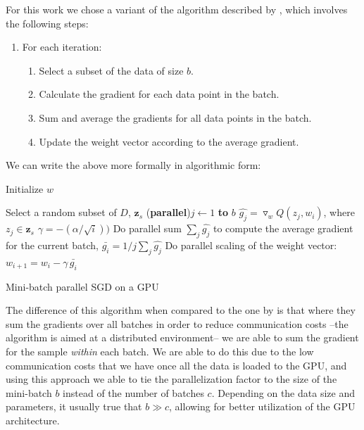\documentclass[11pt,a4paper]{article}
\begin{document}
For this work we chose a variant of the algorithm described by \cite{dekel2012optimal}, which involves the following steps:
\begin{enumerate}
	\item  	For each iteration:
	\begin{enumerate}
		\item Select a subset of the data of size $b$.
		\item Calculate the gradient for each data point in the batch.
		\item Sum and average the gradients for all data points in the batch.
		\item Update the weight vector according to the average gradient.
	\end{enumerate}
\end{enumerate}

We can write the above more formally in algorithmic form:

\begin{algorithm}
	\DontPrintSemicolon %
	Initialize $w$\;
	 {
		Select a random subset of $D$, $\mathbf{z}_s$\;
		\For(\textbf{parallel}){$j \gets 1$ \textbf{to} $b$} {
			$\hat{g_j} = \triangledown_w Q(z_j, w_i)$, where $z_j \in \mathbf{z}_s$\;
		}
		$\gamma = -(\alpha / \sqrt{i}))$\;
		Do parallel sum $\sum_j{\hat{g_j}}$ to compute the average gradient for the current batch, $\bar{g_i} = 1/j \sum_j{\hat{g_j}}$\;
		Do parallel scaling of the weight vector: $w_{i + 1} = w_i - \gamma \,  \bar{g_i}$\;

	}
	\;
	\caption{Mini-batch parallel SGD on a GPU}
	\label{algo:sgd-gpu}
\end{algorithm}

The difference of this algorithm when compared to the one by \cite{dekel2012optimal} is that where
they sum the gradients over all batches in order to reduce communication costs --the algorithm is
aimed at a distributed environment-- we are able to sum the gradient for the sample \textit{within}
each batch. We are able to do this due to the low communication costs that we have once all the
data is loaded to the GPU, and using this approach we able to tie the parallelization factor to the
size of the mini-batch $b$ instead of the number of batches $c$. Depending on the data size and
parameters, it usually true that $b \gg c$, allowing for better utilization of the GPU
architecture.
\end{document}
